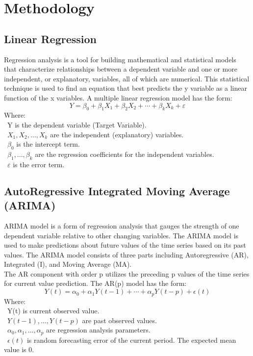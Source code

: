 \documentclass{ieeeojies}
\begin{document}
\section{Methodology}

\subsection{Linear Regression}
Regression analysis is a tool for building mathematical and statistical models that characterize relationships between a dependent variable and one or more independent, or explanatory, variables, all of which are numerical. This statistical technique is used to find an equation that best predicts the y variable as a linear function of the x variables.
A multiple linear regression model has the form: 
\[Y=\beta_0+\beta_1X_1+\beta_2X_2+\cdots+\beta_kX_k+\varepsilon\]
Where:\\
	\indent\textbullet\ Y is the dependent variable (Target Variable).\\
	\indent\textbullet\ \(X_1, X_2, \ldots, X_k\) are the independent (explanatory) variables.\\
	\indent\textbullet\ \(\beta_0\) is the intercept term.\\
	\indent\textbullet\ \(\beta_1,..., \beta_k\) are the regression coefficients for the independent variables.\\
	\indent\textbullet\ \(\varepsilon\) is the error term.

 \subsection{AutoRegressive Integrated Moving Average (ARIMA)}
 ARIMA model is a form of regression analysis that gauges the strength of one dependent variable relative to other changing variables. The ARIMA model is used to make predictions about future values of the time series based on its past values. The ARIMA model consists of three parts including Autoregressive (AR), Integrated (I), and Moving Average (MA).\\ 
 
 The AR component with order p utilizes the preceding p values of the time series for current value prediction. The AR(p) model has the form:
 \[Y(t)=\alpha_0+\alpha_1Y(t-1)+\cdots+\alpha_pY(t-p)+\epsilon(t)\]
         Where:\\
	     \indent\textbullet\ Y(t) is current observed value.\\
          \indent\textbullet\ \(Y(t-1), \ldots, Y(t-p)\) are past observed values.\\
          \indent\textbullet\ \(\alpha_0, \alpha_1, \ldots, \alpha_p\) are regression analysis parameters.\\
          \indent\textbullet\ \(\epsilon(t)\) is random forecasting error of the current period. The expected mean value is 0.\\
            
\end{document}

